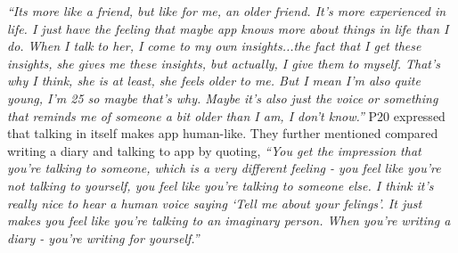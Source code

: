                 \textit{
                ``Its more like a friend, but like for me, an older friend. It's more experienced in life. I just have the feeling that maybe \acl{app} knows more about things in life than I do.
                When I talk to her, I come to my own insights...the fact that I get these insights, she gives me these insights, but actually, I give them to myself. That's why I think, she is at least, she feels older to me. But I mean I'm also quite young, I'm 25 so maybe that's why.
                Maybe it's also just the voice or something that reminds me of someone a bit older than I am, I don't know.''
                }
            P20 expressed that talking in itself makes \acl{app} human-like. They further mentioned compared writing a diary and talking to \acl{app} by quoting,
                \textit{``You get the impression that you’re talking to someone, which is a very different feeling - you feel like you’re not talking to yourself, you feel like you’re talking to someone else. I think it’s really nice to hear a human voice saying `Tell me about your felings'. 
                It just makes you feel like you’re talking to an imaginary person. When you're writing a diary - you’re writing for yourself.''}
